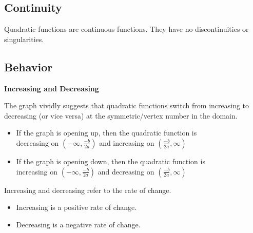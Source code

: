 \documentclass{ximera}
\begin{document}
\subsection{Continuity}

Quadratic functions are continuous functions.  They have no discontinuities or singularities. \\














\subsection{Behavior}



\textbf{\textcolor{blue!55!black}{Increasing and Decreasing}}






The graph vividly suggests that quadratic functions switch from increasing to decreasing (or vice versa) at the symmetric/vertex number in the domain.


\begin{itemize}
\item If the graph is opening up, then the quadratic function is \\

decreasing on $\left( -\infty, \frac{-b}{2a} \right)$ and increasing on $\left( \frac{-b}{2a}, \infty \right)$

\item If the graph is opening down, then the quadratic function is \\

increasing on $\left( -\infty, \frac{-b}{2a} \right)$ and decreasing on $\left( \frac{-b}{2a}, \infty \right)$
\end{itemize}





Increasing and decreasing refer to the rate of change.


\begin{itemize}
\item Increasing is a positive rate of change.
\item Decreasing is a negative rate of change.
\end{itemize}
\end{document}
